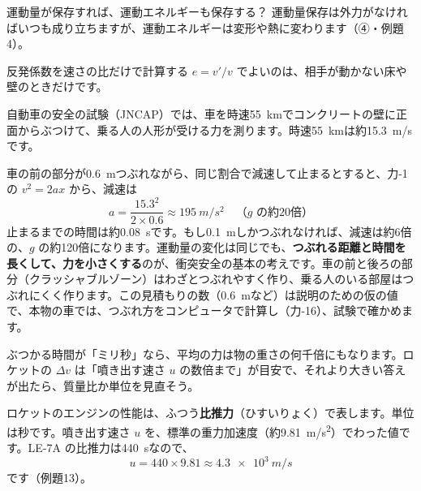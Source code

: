 \begin{tsumazuki}{運動量が保存すれば、運動エネルギーも保存する？}
運動量保存は外力がなければいつも成り立ちますが、運動エネルギーは変形や熱に変わります（④・例題4）。
\end{tsumazuki}

\begin{tsumazuki}{反発係数を速さの比だけで計算する}
$e=v'/v$ でよいのは、相手が動かない床や壁のときだけです。
\end{tsumazuki}

\begin{phkougaku}[ぶつかっても乗る人を守る車]
自動車の安全の試験（JNCAP）では、車を時速\qty{55}{km}でコンクリートの壁に正面からぶつけて、乗る人の人形が受ける力を測ります。時速\qty{55}{km}は約\qty{15.3}{m/s}です。

車の前の部分が\qty{0.6}{m}つぶれながら、同じ割合で減速して止まるとすると、力-1の $v^2=2ax$ から、減速は
\[a=\frac{15.3^2}{2\times0.6}\approx\qty{195}{m/s^2}\quad\text{（$g$ の約20倍）}\]
止まるまでの時間は約\qty{0.08}{s}です。もし\qty{0.1}{m}しかつぶれなければ、減速は約6倍の、$g$ の約120倍になります。運動量の変化は同じでも、\textbf{つぶれる距離と時間を長くして、力を小さくする}のが、衝突安全の基本の考えです。車の前と後ろの部分（クラッシャブルゾーン）はわざとつぶれやすく作り、乗る人のいる部屋はつぶれにくく作ります。この見積もりの数（\qty{0.6}{m}など）は説明のための仮の値で、本物の車では、つぶれ方をコンピュータで計算し（力-16）、試験で確かめます。

\begin{phketa}[衝突と噴き出す速さ]
ぶつかる時間が「ミリ秒」なら、平均の力は物の重さの何千倍にもなります。ロケットの $\Delta v$ は「噴き出す速さ $u$ の数倍まで」が目安で、それより大きい答えが出たら、質量比か単位を見直そう。
\end{phketa}

ロケットのエンジンの性能は、ふつう\textbf{比推力}（ひすいりょく）で表します。単位は秒です。噴き出す速さ $u$ を、標準の重力加速度（約\qty{9.81}{m/s^2}）でわった値です。LE-7A の比推力は\qty{440}{s}なので、
\[u=440\times9.81\approx\qty{4.3e3}{m/s}\]
です（例題13）。
\end{phkougaku}

